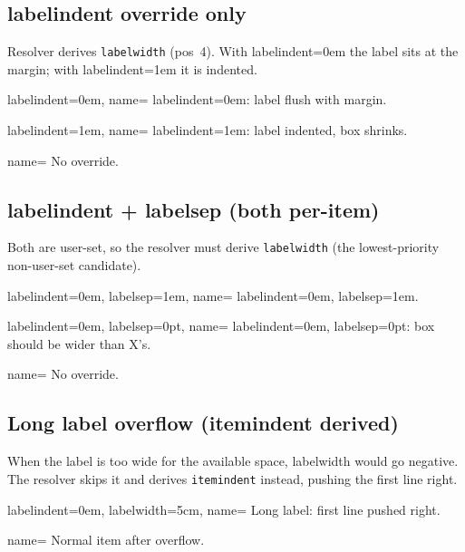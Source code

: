 \documentclass{article}
\newlength{\flabelwd}
\newcommand{\flabel}[1]{%
  \settowidth{\flabelwd}{\textbf{#1}}%
  \ifdim\flabelwd<\dimexpr\labelwidth-2\fboxsep-2\fboxrule\relax
    \setlength{\flabelwd}{\dimexpr\labelwidth-2\fboxsep-2\fboxrule\relax}%
  \fi
  \fbox{\makebox[\flabelwd]{\textbf{#1}\hfill}}}
\begin{document}
\subsection{labelindent override only}

Resolver derives \texttt{labelwidth} (pos~4).  With labelindent=0em the
label sits at the margin; with labelindent=1em it is indented.

\begin{prop}
  \item[labelindent=0em, name=\flabel{Flush}]
    labelindent=0em: label flush with margin.
  \item[labelindent=1em, name=\flabel{Ind}]
    labelindent=1em: label indented, box shrinks.
  \item[name=\flabel{Def}] No override.
\end{prop}

\subsection{labelindent + labelsep (both per-item)}

Both are user-set, so the resolver must derive \texttt{labelwidth}
(the lowest-priority non-user-set candidate).

\begin{prop}
  \item[labelindent=0em, labelsep=1em, name=\flabel{X}]
    labelindent=0em, labelsep=1em.
  \item[labelindent=0em, labelsep=0pt, name=\flabel{Y}]
    labelindent=0em, labelsep=0pt: box should be wider than X's.
  \item[name=\flabel{Ref}] No override.
\end{prop}

\subsection{Long label overflow (itemindent derived)}

When the label is too wide for the available space, labelwidth would go
negative.  The resolver skips it and derives \texttt{itemindent}
instead, pushing the first line right.

\begin{prop}
  \item[labelindent=0em, labelwidth=5cm, name=\flabel{Long label}]
    Long label: first line pushed right.
  \item[name=\flabel{OK}] Normal item after overflow.
\end{prop}
\end{document}

